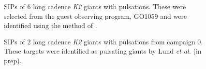 \documentclass[useAMS, usenatbib]{aastex}
\begin{document}
\begin{figure}
\begin{center}
{        }
    \end{center}
    \caption{SIPs of 6 long cadence {\it K2} giants with pulsations. These
	     were selected from the guest observing program, GO1059 and were
	     identified using the method of \citet{Huber2009}.
\label{fig:astero_examples}}
\end{figure}

\begin{figure}
\begin{center}
    \end{center}
    \caption{SIPs of 2 long cadence {\it K2} giants with
	    pulsations from campaign 0. These targets were identified as
	    pulsating giants by Lund {\it et al.} (in prep).
\label{fig:c0}}
\end{figure}
\end{document}
